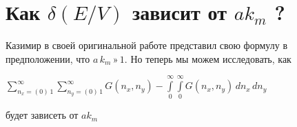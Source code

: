 \documentclass[11pt]{article}
\begin{document}
    \section{\texorpdfstring{Как \(\delta\left(E/V\right)\) зависит от
\(a k_m\)
?}{Как \textbackslash{}delta\textbackslash{}left(E/V\textbackslash{}right) зависит от a k\_m ?}}\label{ux43aux430ux43a-deltaleftevright-ux437ux430ux432ux438ux441ux438ux442-ux43eux442-a-k_m}

    Казимир в своей оригинальной работе представил свою формулу в
предположении, что \(a\,k_m\,»\,1\). Но теперь мы можем исследовать, как

\(\sum\limits_{n_x=\left(0\right)\,1}^{\infty} \sum\limits_{n_y=\left(0\right)\,1}^{\infty} G\left(n_x, n_y\right) - \int\limits_{0}^{\infty} \int\limits_{0}^{\infty} G\left(n_x, n_y\right)\,d{n_x}\,d{n_y}\)

будет зависеть от \(a k_m\)
\end{document}
